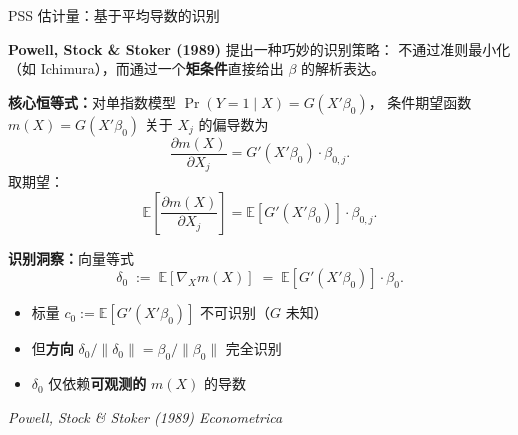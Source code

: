 \documentclass[aspectratio=169, 10pt]{beamer}
\begin{document}
\begin{frame}[shrink=10]{PSS 估计量：基于平均导数的识别}

  \textbf{Powell, Stock \& Stoker (1989)} 提出一种巧妙的识别策略：
  不通过准则最小化（如 Ichimura），而通过一个\textbf{矩条件}直接给出 $\beta$ 的解析表达。

  \begin{keybox}
    \textbf{核心恒等式：}对单指数模型 $\Pr(Y=1\mid X) = G(X'\beta_0)$，
    条件期望函数 $m(X) = G(X'\beta_0)$ 关于 $X_j$ 的偏导数为
    $$\frac{\partial m(X)}{\partial X_j} = G'(X'\beta_0) \cdot \beta_{0,j}.$$
    取期望：
    $$\mathbb{E}\!\left[\frac{\partial m(X)}{\partial X_j}\right]
    = \mathbb{E}[G'(X'\beta_0)] \cdot \beta_{0,j}.$$
  \end{keybox}

  \begin{highlightbox}
    \textbf{识别洞察：}向量等式
    $$\boxed{\;\delta_0 \;:=\; \mathbb{E}[\nabla_X m(X)] \;=\; \mathbb{E}[G'(X'\beta_0)] \cdot \beta_0.\;}$$
    \begin{itemize}\setlength{\itemsep}{1pt}
      \item 标量 $c_0 := \mathbb{E}[G'(X'\beta_0)]$ 不可识别（$G$ 未知）
      \item 但\textbf{方向} $\delta_0 / \|\delta_0\| = \beta_0 / \|\beta_0\|$ 完全识别
      \item $\delta_0$ 仅依赖\textbf{可观测的} $m(X)$ 的导数
    \end{itemize}
  \end{highlightbox}

  \hfill{\scriptsize\textit{Powell, Stock \& Stoker (1989) Econometrica}}

\end{frame}
\end{document}
